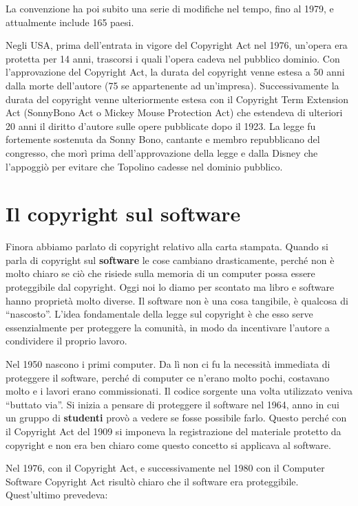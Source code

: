 La convenzione ha poi subito una serie di modifiche nel tempo, fino al 1979, e attualmente include 165 paesi. 

Negli USA, prima dell'entrata in vigore del Copyright Act nel 1976, un'opera era protetta per 14 anni, trascorsi i quali l'opera cadeva nel pubblico dominio. Con l'approvazione del Copyright Act, la durata del copyright venne estesa a 50 anni dalla morte dell'autore (75 se appartenente ad un'impresa). Successivamente la durata del copyright venne ulteriormente estesa con il Copyright Term Extension Act (SonnyBono Act o Mickey Mouse Protection Act) che estendeva di ulteriori 20 anni il diritto d'autore sulle opere pubblicate dopo il 1923. La legge fu fortemente sostenuta da Sonny Bono, cantante e membro repubblicano del congresso, che morì prima dell'approvazione della legge e dalla Disney che l'appoggiò per evitare che Topolino cadesse nel dominio pubblico.

\section{Il copyright sul software}

Finora abbiamo parlato di copyright relativo alla carta stampata. Quando si parla di copyright sul \textbf{software} le cose cambiano drasticamente, perché non è molto chiaro se ciò che risiede sulla memoria di un computer possa essere proteggibile dal copyright. 
Oggi noi lo diamo per scontato ma libro e software hanno proprietà molto diverse. Il software non è una cosa tangibile, è qualcosa di ``nascosto''. L'idea fondamentale della legge sul copyright è che esso serve essenzialmente per proteggere la comunità, in modo da incentivare l'autore a condividere il proprio lavoro. 

Nel 1950 nascono i primi computer. Da lì non ci fu la necessità immediata di proteggere il software, perché di computer ce n'erano molto pochi, costavano molto e i lavori erano commissionati. Il codice sorgente una volta utilizzato veniva ``buttato via''. 
Si inizia a pensare di proteggere il software nel 1964, anno in cui un gruppo di \textbf{studenti} provò a vedere se fosse possibile farlo. Questo perché con il Copyright Act del 1909 si imponeva la registrazione del materiale protetto da copyright e non era ben chiaro come questo concetto si applicava al software.

Nel 1976, con il Copyright Act, e successivamente nel 1980 con il Computer Software Copyright Act risultò chiaro che il software era proteggibile. Quest'ultimo prevedeva:

